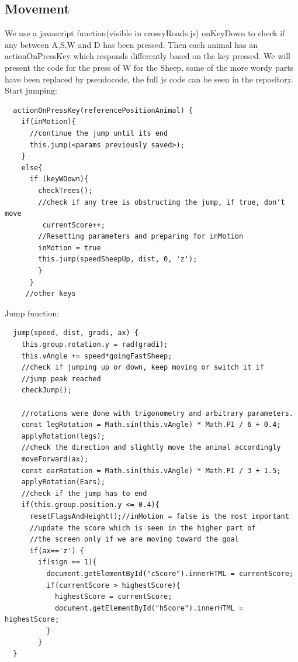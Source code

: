 \documentclass[a4paper, 11pt]{article}
\begin{document}
\subsection{Movement}
We use a javascript function(visible in crossyRoads.js) onKeyDown to check if any between A,S,W and D has been pressed. Then each animal has an actionOnPressKey which responds differently based on the key pressed. We will present the code for the press of W for the Sheep, some of the more wordy parts have been replaced by pseudocode, the full js code can be seen in the repository.
Start jumping:\\
\begin{lstlisting}
  actionOnPressKey(referencePositionAnimal) {
    if(inMotion){
      //continue the jump until its end
      this.jump(<params previously saved>);
    }
    else{
      if (keyWDown){
        checkTrees();
        //check if any tree is obstructing the jump, if true, don't move
         currentScore++;
        //Resetting parameters and preparing for inMotion
        inMotion = true
        this.jump(speedSheepUp, dist, 0, 'z');
        }
      }
     //other keys
\end{lstlisting}
Jump function:
\begin{lstlisting}
  jump(speed, dist, gradi, ax) {
    this.group.rotation.y = rad(gradi);
    this.vAngle += speed*goingFastSheep;
    //check if jumping up or down, keep moving or switch it if
    //jump peak reached
    checkJump();
	
    //rotations were done with trigonometry and arbitrary parameters.
    const legRotation = Math.sin(this.vAngle) * Math.PI / 6 + 0.4;
    applyRotation(legs);
    //check the direction and slightly move the animal accordingly
    moveForward(ax);
    const earRotation = Math.sin(this.vAngle) * Math.PI / 3 + 1.5;
    applyRotation(Ears);
    //check if the jump has to end
    if(this.group.position.y <= 0.4){
	  resetFlagsAndHeight();//inMotion = false is the most important
	  //update the score which is seen in the higher part of 
	  //the screen only if we are moving toward the goal
      if(ax=='z') {
        if(sign == 1){
          document.getElementById("cScore").innerHTML = currentScore;
          if(currentScore > highestScore){
            highestScore = currentScore;
            document.getElementById("hScore").innerHTML = highestScore;
          }
        }
  }
\end{lstlisting}
\end{document}
